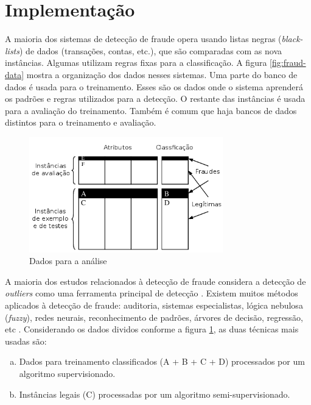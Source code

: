 \section{Implementação}

A maioria dos sistemas de detecção de fraude opera usando listas negras (\emph{black-lists}) de dados (transações, contas, etc.), que são comparadas com as nova instâncias. Algumas utilizam regras fixas para a classificação. A figura \ref{fig:fraud-data} mostra a organização dos dados nesses sistemas. Uma parte do banco de dados é usada para o treinamento. Esses são os dados onde o sistema aprenderá os padrões e regras utilizados para a detecção. O restante das instâncias é usada para a avaliação do treinamento. Também é comum que haja bancos de dados distintos para o treinamento e avaliação.

\begin{figure}[h!]
    \vspace{1cm}
\centering
\includegraphics[width=0.75\textwidth]{img/fraud-data.png}
\caption{Dados para a análise \cite{Phua2010}}
\label{fig:fraud_data}
    \vspace{1cm}
\end{figure}

A maioria dos estudos relacionados à detecção de fraude considera a detecção de \emph{outliers} como uma ferramenta principal de detecção \cite{Aral2011}. Existem muitos métodos aplicados à detecção de fraude: auditoria, sistemas especialistas, lógica nebulosa (\emph{fuzzy}), redes neurais, reconhecimento de padrões, árvores de decisão, regressão, etc \cite{Huang2010}. Considerando os dados dividos conforme a figura \ref{fig:fraud_data}, as duas técnicas mais usadas são:

\begin{enumerate}[a)]
\item Dados para treinamento classificados (A + B + C + D) processados por um algoritmo supervisionado.
\item Instâncias legais (C) processadas por um algoritmo semi-supervisionado.
\end{enumerate}

